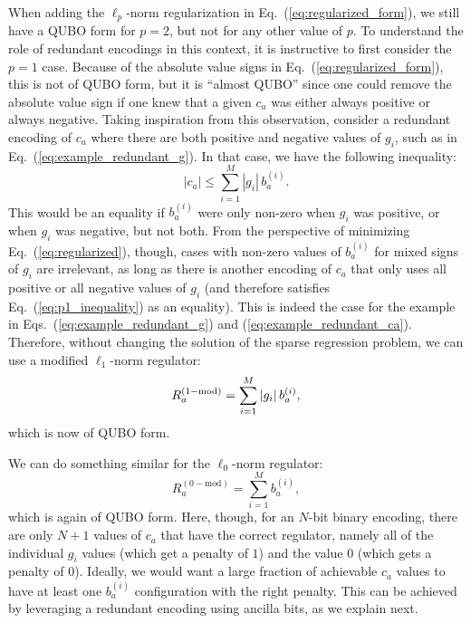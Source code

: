 \documentclass[aps,prd,twocolumn, superscriptaddress,preprintnumbers, nofootinbib,longbibliography,floatfix]{revtex4-2}
\DeclareRobustCommand{\Eq}[1]{Eq.~(\ref{#1})}
\DeclareRobustCommand{\Eqs}[2]{Eqs.~(\ref{#1}) and (\ref{#2})}
\begin{document}
When adding the $\ell_p$-norm regularization in \Eq{eq:regularized_form}, we still have a QUBO form for $p=2$, but not for any other value of $p$.
%
To understand the role of redundant encodings in this context, it is instructive to first consider the $p = 1$ case.
%
Because of the absolute value signs in \Eq{eq:regularized_form}, this is not of QUBO form, but it is ``almost QUBO'' since one could remove the absolute value sign if one knew that a given $c_a$ was either always positive or always negative.
%
Taking inspiration from this observation, consider a redundant encoding of $c_a$ where there are both positive and negative values of $g_i$, such as in \Eq{eq:example_redundant_g}.
%
In that case, we have the following inequality:
%
\begin{equation}
\label{eq:p1_inequality}
|c_a| \leq \sum_{i = 1}^M  |g_i| \, b^{(i)}_a.
\end{equation} 
%
This would be an equality if $b^{(i)}_a$ were only non-zero when $g_i$ was positive, or when $g_i$ was negative, but not both.
%
From the perspective of minimizing \Eq{eq:regularized}, though, cases with non-zero values of $b^{(i)}_a$ for mixed signs of $g_i$ are irrelevant, as long as there is another encoding of $c_a$ that only uses all positive or all negative values of $g_i$ (and therefore satisfies \Eq{eq:p1_inequality} as an equality).
%
This is indeed the case for the example in \Eqs{eq:example_redundant_g}{eq:example_redundant_ca}.
%
Therefore, without changing the solution of the sparse regression problem, we can use a modified $\ell_1$-norm regulator:
%
\begin{equation}
\label{eq:regularized_form_1}
R_a^{(1-{\rm mod})} = \sum_{i = 1}^M  |g_i| \, b^{(i)}_a,
\end{equation}
%
which is now of QUBO form.


We can do something similar for the $\ell_0$-norm regulator:
%
\begin{equation}
\label{eq:regularized_form_0}
R_a^{(0-\text{mod})} = \sum_{i = 1}^M  b^{(i)}_a,
\end{equation}
%
which is again of QUBO form.
%
Here, though, for an $N$-bit binary encoding, there are only $N+1$ values of $c_a$ that have the correct regulator, namely all of the individual $g_i$ values (which get a penalty of $1$) and the value $0$ (which gets a penalty of $0$).
%
Ideally, we would want a large fraction of achievable $c_a$ values to have at least one $b^{(i)}_a$ configuration with the right penalty.
%
This can be achieved by leveraging a redundant encoding using ancilla bits, as we explain next.
\end{document}

